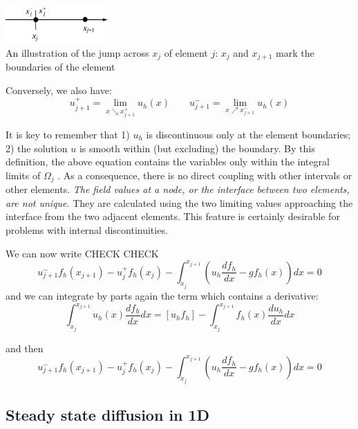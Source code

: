 \begin{center}
\includegraphics[width=4cm]{images/dgfem/dgfem_1}\\
{\scriptsize An illustration of the jump across $x_j$ of element $j$: 
$x_j$ and $x_{j+1}$ mark the
boundaries of the element}
\end{center}

Conversely, we also have:
\begin{equation}
u_{j+1}^+ = \lim_{x \searrow x_{j+1}^+} u_h(x)
\qquad
u_{j+1}^- = \lim_{x \nearrow x_{j+1}^-} u_h(x)
\end{equation}



It is key to remember that 1) $u_h$ is discontinuous only at the element boundaries; 
2) the solution $u$ is smooth within (but excluding) the boundary. 
By this definition, the above equation contains the variables only within the integral limits of $\Omega_j$ . 
As a consequence, there is no direct coupling with other intervals or other elements. 
{\sl The field values at a node, or the interface between two elements, are not unique}. They are
calculated using the two limiting values approaching the interface from the two
adjacent elements. This feature is certainly desirable for problems with internal
discontinuities.

We can now write CHECK CHECK
\begin{equation}
u_{j+1}^- f_h(x_{j+1}) - u_j^+ f_h(x_{j}) 
-\int_{x_j}^{x_{j+1}} \left( u_h \frac{d f_h}{dx} - g f_h(x)\right)  dx = 0
\end{equation}
and we can integrate by parts again the term which contains a derivative:
\[
\int_{x_j}^{x_{j+1}} u_h(x) \frac{d f_h}{dx} dx = [u_h f_h] -  \int_{x_j}^{x_{j+1}} f_h(x) \frac{d u_h}{dx} dx 
\]

and then 
\begin{equation}
u_{j+1}^- f_h(x_{j+1}) - u_j^+ f_h(x_{j}) 
-\int_{x_j}^{x_{j+1}} \left( u_h \frac{d f_h}{dx} - g f_h(x)\right)  dx = 0
\end{equation}


\newpage
\subsection{Steady state diffusion in 1D \label{ss:dgss1D}}

